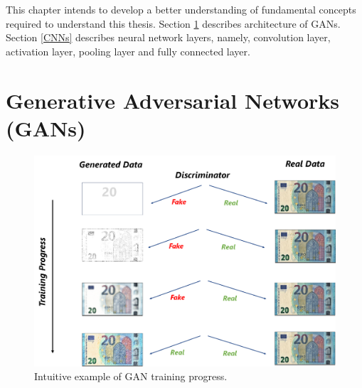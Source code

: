 \justifying
\setlength{\parskip}{1em}

This chapter intends to develop a better understanding of fundamental concepts required to understand this thesis. Section \ref{GenerativeAdversarialNetworks} describes architecture of \acp{GAN}. Section \ref{CNNs} describes neural network layers, namely, convolution layer, activation layer, pooling layer and fully connected layer.


\section{Generative Adversarial Networks (GANs)}\label{GenerativeAdversarialNetworks}

\begin{figure}[H]
        \begin{center}
	    \includegraphics[scale=0.30]{images/Fundamentals/GANTrainingintuition.png}
	    \caption[Intuitive example of \ac{GAN} training progress.]{Intuitive example of \ac{GAN} training progress.}
	    \label{fig:GANTrainingintuition}
	    \end{center}
\end{figure}


